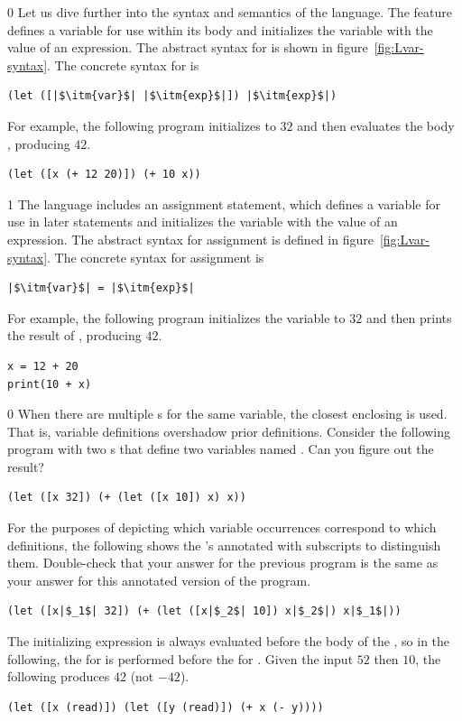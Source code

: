 \documentclass[7x10]{TimesAPriori_MIT}%
\def\racketEd{0}
\def\pythonEd{1}
\def\edition{1}
\newcommand{\pythonColor}[0]{}
\numberwithin{theorem}{chapter}
\numberwithin{definition}{chapter}
\numberwithin{equation}{chapter}
\begin{document}
{\if\edition\racketEd
Let us dive further into the syntax and semantics of the \LangVar{}
language.  The  feature defines a variable for use within its
body and initializes the variable with the value of an expression.
The abstract syntax for  is shown in
figure~\ref{fig:Lvar-syntax}.  The concrete syntax for  is
\begin{lstlisting}
(let ([|$\itm{var}$| |$\itm{exp}$|]) |$\itm{exp}$|)
\end{lstlisting}
For example, the following program initializes  to $32$ and then
evaluates the body , producing $42$.
\begin{lstlisting}
(let ([x (+ 12 20)]) (+ 10 x))
\end{lstlisting}
\fi}
%
{\if\edition\pythonEd\pythonColor
%
The \LangVar{} language includes an assignment statement, which defines a
variable for use in later statements and initializes the variable with
the value of an expression.  The abstract syntax for assignment is
defined in figure~\ref{fig:Lvar-syntax}.  The concrete syntax for
assignment is 
\begin{lstlisting}
|$\itm{var}$| = |$\itm{exp}$|
\end{lstlisting}
For example, the following program initializes the variable 
to $32$ and then prints the result of , producing $42$.
\begin{lstlisting}
x = 12 + 20
print(10 + x)
\end{lstlisting}
\fi}

{\if\edition\racketEd
%  
When there are multiple s for the same variable, the closest
enclosing  is used. That is, variable definitions overshadow
prior definitions. Consider the following program with two s
that define two variables named . Can you figure out the
result?
\begin{lstlisting}
(let ([x 32]) (+ (let ([x 10]) x) x))
\end{lstlisting}
For the purposes of depicting which variable occurrences correspond to
which definitions, the following shows the 's annotated with
subscripts to distinguish them. Double-check that your answer for the
previous program is the same as your answer for this annotated version
of the program.
\begin{lstlisting}
(let ([x|$_1$| 32]) (+ (let ([x|$_2$| 10]) x|$_2$|) x|$_1$|))
\end{lstlisting}
The initializing expression is always evaluated before the body of the
, so in the following, the  for  is
performed before the  for . Given the input
$52$ then $10$, the following produces $42$ (not $-42$).
\begin{lstlisting}
(let ([x (read)]) (let ([y (read)]) (+ x (- y))))
\end{lstlisting}
\fi}
\end{document}

